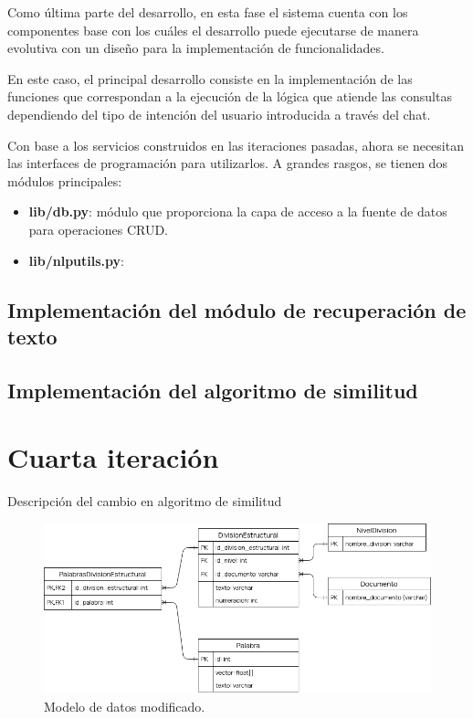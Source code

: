 Como última parte del desarrollo, en esta fase el sistema cuenta con los componentes base con los cuáles el desarrollo puede ejecutarse de manera evolutiva con un diseño para la implementación de funcionalidades.

En este caso, el principal desarrollo consiste en la implementación de las funciones que correspondan a la ejecución de la lógica que atiende las consultas dependiendo del tipo de intención del usuario introducida a través del chat.

Con base a los servicios construidos en las iteraciones pasadas, ahora se necesitan las interfaces de programación para utilizarlos. A grandes rasgos, se tienen dos módulos principales:

\begin{itemize}
    \item \textbf{lib/db.py}: módulo que proporciona la capa de acceso a la fuente de datos para operaciones CRUD.
    \item \textbf{lib/nlputils.py}:
\end{itemize}
 
\subsection{Implementación del módulo de recuperación de texto}



\subsection{Implementación del algoritmo de similitud}
 
 
\section{Cuarta iteración}

Descripción del cambio en algoritmo de similitud
 
 \begin{figure}
     \centering
     \includegraphics[scale=0.55]{images/6/modelo-relacional-modificado}
     \caption{Modelo de datos modificado.}
     \label{fig:modelo-datos-v2}
 \end{figure}